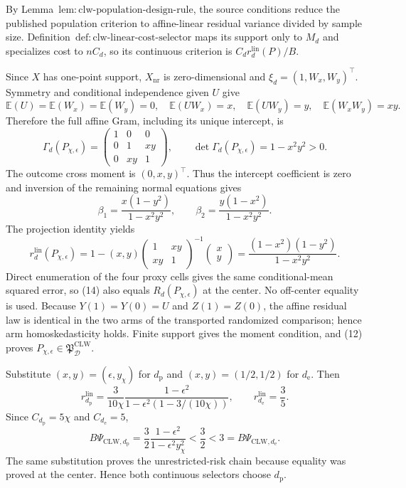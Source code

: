 By Lemma~\(\mathrm{lem{:}clw\text{-}population\text{-}design\text{-}rule}\), the source conditions reduce the published population criterion to affine-linear residual variance divided by sample size. Definition~\(\mathrm{def{:}clw\text{-}linear\text{-}cost\text{-}selector}\) maps its support only to \(M_d\) and specializes cost to \(nC_d\), so its continuous criterion is \(C_dr_d^{\mathrm{lin}}(P)/B\).

Since \(X\) has one-point support, \(X_{\mathrm{nr}}\) is zero-dimensional and \(\xi_d=(1,W_x,W_y)^\top\). Symmetry and conditional independence given \(U\) give
\[
 \mathbb E(U)=\mathbb E(W_x)=\mathbb E(W_y)=0,
 \quad \mathbb E(UW_x)=x,
 \quad \mathbb E(UW_y)=y,
 \quad \mathbb E(W_xW_y)=xy.                              \tag{11}
\]
Therefore the full affine Gram, including its unique intercept, is
\[
 \Gamma_d(P_{\chi,\epsilon})
 =\begin{pmatrix}1&0&0\\0&1&xy\\0&xy&1\end{pmatrix},
 \qquad \det\Gamma_d(P_{\chi,\epsilon})=1-x^2y^2>0.       \tag{12}
\]
The outcome cross moment is \((0,x,y)^\top\). Thus the intercept coefficient is zero and inversion of the remaining normal equations gives
\[
 \beta_1=\frac{x(1-y^2)}{1-x^2y^2},
 \qquad
 \beta_2=\frac{y(1-x^2)}{1-x^2y^2}.                        \tag{13}
\]
The projection identity yields
\[
 r_d^{\mathrm{lin}}(P_{\chi,\epsilon})
 =1-(x,y)
 \begin{pmatrix}1&xy\\xy&1\end{pmatrix}^{-1}
 \begin{pmatrix}x\\y\end{pmatrix}
 =\frac{(1-x^2)(1-y^2)}{1-x^2y^2}.                         \tag{14}
\]
Direct enumeration of the four proxy cells gives the same conditional-mean squared error, so (14) also equals \(R_d(P_{\chi,\epsilon})\) at the center. No off-center equality is used. Because \(Y(1)=Y(0)=U\) and \(Z(1)=Z(0)\), the affine residual law is identical in the two arms of the transported randomized comparison; hence arm homoskedasticity holds. Finite support gives the moment condition, and (12) proves \(P_{\chi,\epsilon}\in\mathfrak P_{\mathcal D}^{\mathrm{CLW}}\).

Substitute \((x,y)=(\epsilon,y_\chi)\) for \(d_{\mathrm p}\) and \((x,y)=(1/2,1/2)\) for \(d_{\mathrm e}\). Then
\[
 r_{d_{\mathrm p}}^{\mathrm{lin}}
 =\frac{3}{10\chi}
 \frac{1-\epsilon^2}{1-\epsilon^2(1-3/(10\chi))},
 \qquad r_{d_{\mathrm e}}^{\mathrm{lin}}=\frac35.         \tag{15}
\]
Since \(C_{d_{\mathrm p}}=5\chi\) and \(C_{d_{\mathrm e}}=5\),
\[
 B\Psi_{\mathrm{CLW},d_{\mathrm p}}
 =\frac32\frac{1-\epsilon^2}{1-\epsilon^2y_\chi^2}
 <\frac32<3=B\Psi_{\mathrm{CLW},d_{\mathrm e}}.           \tag{16}
\]
The same substitution proves the unrestricted-risk chain because equality was proved at the center. Hence both continuous selectors choose \(d_{\mathrm p}\).

